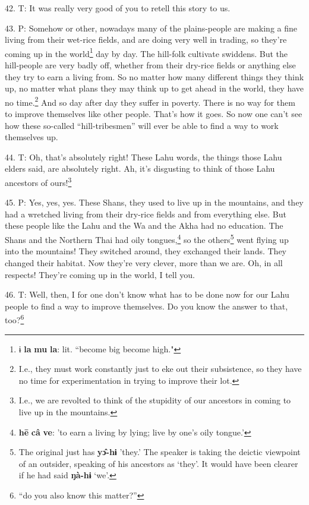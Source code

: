 42. T: It was really very good of you to retell this story to us.

43. P: Somehow or other, nowadays many of the plains-people are making a fine living
from their wet-rice fields, and are doing very well in trading, so they're coming
up in the world\footnote{ɨ \textbf{la} \textbf{mu} \textbf{la}: lit. ``become big become high."} day by day. The hill-folk cultivate swiddens. But the hill-people
are very badly off, whether from their dry-rice fields or anything else they try
to earn a living from. So no matter how many different things they think up, no
matter what plans they may think up to get ahead in the world, they have no time.\footnote{I.e., they must work constantly just to eke out their subsistence, so they have no time for experimentation in trying to improve their lot.}
And so day after day they suffer in poverty. There is no way for them to improve
themselves like other people. That's how it goes. So now one can't see how these
so-called ``hill-tribesmen'' will ever be able to find a way to
work themselves up.

44. T: Oh, that's absolutely right! These Lahu words, the things those Lahu elders
said, are absolutely right. Ah, it's disgusting to think of those Lahu ancestors
of ours!\footnote{I.e., we are revolted to think of the stupidity of our ancestors in coming to live up in the mountains.}

45. P: Yes, yes, yes. These Shans, they used to live up in the mountains, and they
had a wretched living from their dry-rice fields and from everything else. But
these people like the Lahu and the Wa and the Akha had no education. The Shans
and the Northern Thai had oily tongues,\footnote{\textbf{hē} \textbf{câ} \textbf{ve}: 'to earn a living by lying; live by one's oily tongue.'} so the others\footnote{The original just has \textbf{yɔ̂-hɨ} 'they.' The speaker is taking the deictic viewpoint of an outsider, speaking of his ancestors as `they'. It would have been clearer if he had said \textbf{ŋà-hɨ} `we'.} went flying up into
the mountains! They switched around, they exchanged their lands. They changed their
habitat. Now they're very clever, more than we are. Oh, in all respects! They're
coming up in the world, I tell you.

46. T: Well, then, I for one don't know what has to be done now for our Lahu people
to find a way to improve themselves. Do you know the answer to that, too?\footnote{``do you also know this matter?''}

